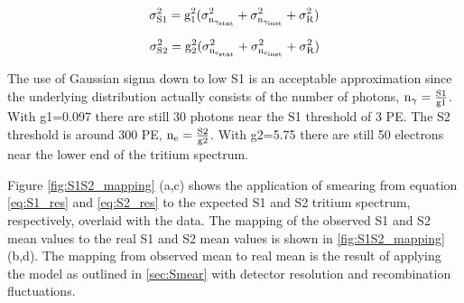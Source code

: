 \begin{equation}
 \rm \sigma_{S1}^2=g_1^2(\sigma_{n_{\gamma_{stat}}}^2+\sigma_{n_{\gamma_{inst}}}^2+\sigma_R^2)
\label{eq:S1_res}
\end{equation}

\begin{equation}
 \rm \sigma_{S2}^2=g_2^2(\sigma_{n_{e_{stat}}}^2+\sigma_{n_{e_{inst}}}^2+\sigma_R^2)
\label{eq:S2_res}
\end{equation}


 The use of Gaussian sigma down to low S1 is an acceptable approximation since the underlying distribution actually consists of the number of photons, $\rm n_\gamma = \frac{S1}{g1}$. With g1=0.097 there are still 30 photons near the S1 threshold of 3 PE. The S2 threshold is around 300 PE, $\rm n_e = \frac{S2}{g2}$. With g2=5.75 there are still 50 electrons near the lower end of the tritium spectrum.






Figure \ref{fig:S1S2_mapping} (a,c) shows the application of smearing from equation \ref{eq:S1_res} and \ref{eq:S2_res} to the expected S1 and S2 tritium spectrum, respectively, overlaid with the data. The mapping of the observed S1 and S2 mean values to the real S1 and S2 mean values  is shown in \ref{fig:S1S2_mapping} (b,d). The mapping from observed mean to real mean is the result of applying the model as outlined in \ref{sec:Smear} with detector resolution and recombination fluctuations. 

